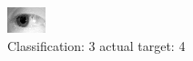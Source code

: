 \begin{figure}[h!]
\begin{center}
\includegraphics[width=0.60\columnwidth]{figures/ID1239_class_3_target_4.png}
\end{center}
\caption{ Classification: 3 actual target: 4}
\label{fig:ID1239_class_3_target_4}
\end{figure}
